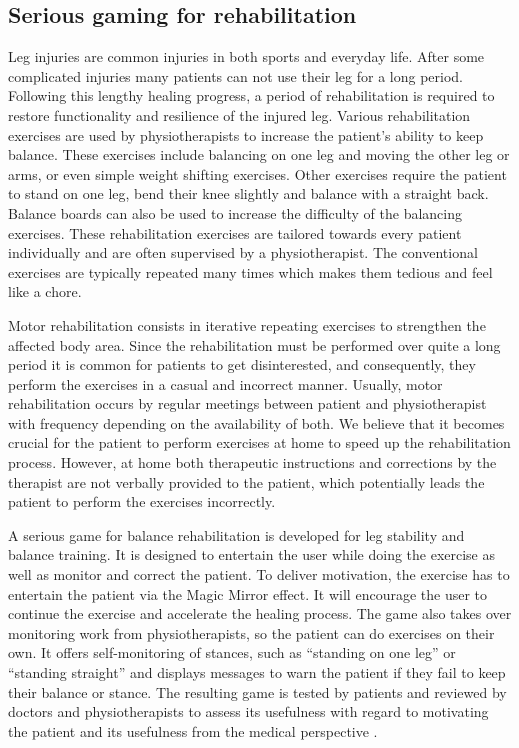 \subsection{Serious gaming for rehabilitation} \label{sec:3-IMR:gaming}
Leg injuries are common injuries in both sports and everyday life. After some complicated injuries many patients can not use their leg for a long period. Following this lengthy healing progress, a period of rehabilitation is required to restore functionality and resilience of the injured leg. Various rehabilitation exercises are used by physiotherapists to increase the patient's ability to keep balance. 
These exercises include balancing on one leg and moving the other leg or arms, or even simple weight shifting exercises. Other exercises require the patient to stand on one leg, bend their knee slightly and balance with a straight back. Balance boards can also be used to increase the difficulty of the balancing exercises. These rehabilitation exercises are tailored towards every patient individually and are often supervised by a physiotherapist. The conventional exercises are typically repeated many times which makes them tedious and feel like a chore.

Motor rehabilitation consists in iterative repeating exercises to strengthen the affected body area. Since the rehabilitation must be performed over quite a long period it is common for patients to get disinterested, and consequently, they perform the exercises in a casual and incorrect manner. 
Usually, motor rehabilitation occurs by regular meetings between patient and physiotherapist with frequency depending on the availability of both. We believe that it becomes crucial for the patient to perform exercises at home to speed up the rehabilitation process. However, at home both therapeutic instructions and corrections by the therapist are not verbally provided to the patient, which potentially leads the patient to perform the exercises incorrectly.

A serious game for balance rehabilitation is developed for leg stability and balance training. It is designed to entertain the user while doing the exercise as well as monitor and correct the patient. To deliver motivation, the exercise has to entertain the patient via the Magic Mirror effect. It will encourage the user to continue the exercise and accelerate the healing process. The game also takes over monitoring work from physiotherapists, so the patient can do exercises on their own. It offers self-monitoring of stances, such as ``standing on one leg'' or ``standing straight'' and displays messages to warn the patient if they fail to keep their balance or stance.
The resulting game is tested by patients and reviewed by doctors and physiotherapists to assess its usefulness with regard to motivating the patient and its usefulness from the medical perspective \cite{Reichhold2014}.

